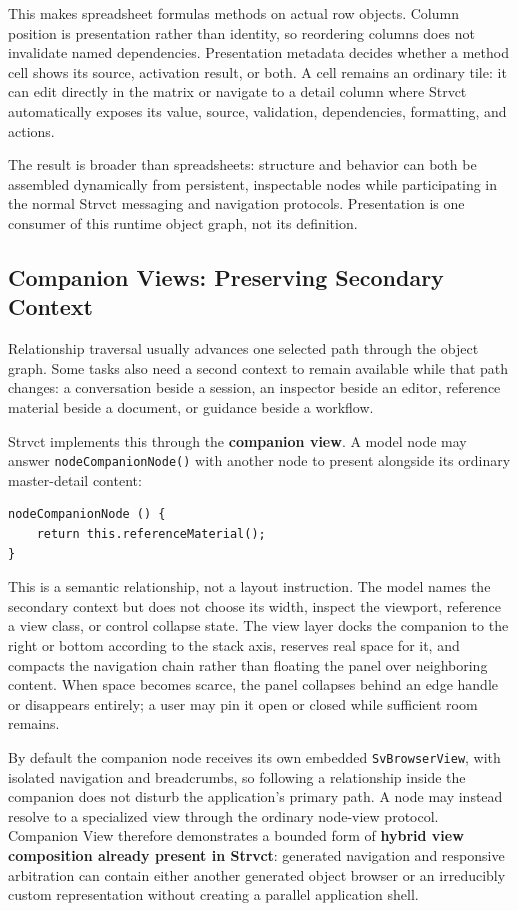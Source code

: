 \documentclass[sigplan,review,anonymous,10pt]{acmart}
\begin{document}
This makes spreadsheet formulas methods on actual row objects. Column position is presentation rather than identity, so reordering columns does not invalidate named dependencies. Presentation metadata decides whether a method cell shows its source, activation result, or both. A cell remains an ordinary tile: it can edit directly in the matrix or navigate to a detail column where Strvct automatically exposes its value, source, validation, dependencies, formatting, and actions.

The result is broader than spreadsheets: structure and behavior can both be assembled dynamically from persistent, inspectable nodes while participating in the normal Strvct messaging and navigation protocols. Presentation is one consumer of this runtime object graph, not its definition.

\subsection{Companion Views: Preserving Secondary Context}
\label{sec:companion}

Relationship traversal usually advances one selected path through the object graph. Some tasks also need a second context to remain available while that path changes: a conversation beside a session, an inspector beside an editor, reference material beside a document, or guidance beside a workflow.

Strvct implements this through the \textbf{companion view}. A model node may answer \texttt{nodeCompanionNode()} with another node to present alongside its ordinary master-detail content:

\begin{verbatim}
nodeCompanionNode () {
    return this.referenceMaterial();
}
\end{verbatim}

This is a semantic relationship, not a layout instruction. The model names the secondary context but does not choose its width, inspect the viewport, reference a view class, or control collapse state. The view layer docks the companion to the right or bottom according to the stack axis, reserves real space for it, and compacts the navigation chain rather than floating the panel over neighboring content. When space becomes scarce, the panel collapses behind an edge handle or disappears entirely; a user may pin it open or closed while sufficient room remains.

By default the companion node receives its own embedded \texttt{SvBrowserView}, with isolated navigation and breadcrumbs, so following a relationship inside the companion does not disturb the application's primary path. A node may instead resolve to a specialized view through the ordinary node-view protocol. Companion View therefore demonstrates a bounded form of \textbf{hybrid view composition already present in Strvct}: generated navigation and responsive arbitration can contain either another generated object browser or an irreducibly custom representation without creating a parallel application shell.
\end{document}
